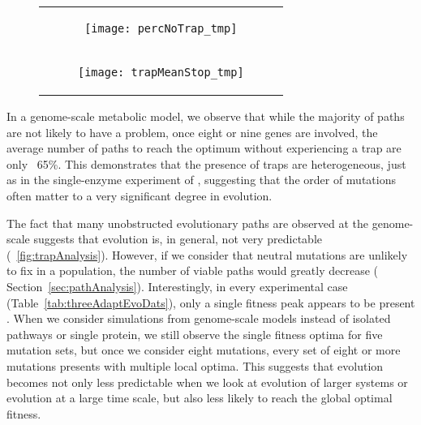 \label{fig:trapAnalysis}

\begin{figure}[H]
\newlength{\figwidth}
\setlength{\figwidth}{0.9\textwidth}
\centering
\begin{tabular}{c}
\begin{subfigure}[b]{\figwidth}
  \texttt{[image: percNoTrap\_tmp]}
  \caption{}
  \label{fig:trapAnalysis:percPath}
\end{subfigure}
\\
\begin{subfigure}[b]{\figwidth}
  \texttt{[image: trapMeanStop\_tmp]}
  \caption{} 
  \label{fig:trapAnalysis:meanStop}
\end{subfigure}
\\
\end{tabular}
\end{figure}


In a genome-scale metabolic model, we observe that while the majority
of paths are not likely to have a problem, once eight or nine genes are
involved, the average number of paths to reach the optimum without
experiencing a trap are only ~65\%. This demonstrates that the
presence of traps are heterogeneous, just as in the single-enzyme
experiment of \citet{Weinreich2006}, suggesting that the order of
mutations often matter to a very significant degree in evolution.

The fact that many unobstructed evolutionary paths are observed at the
genome-scale suggests that evolution is, in general, not very
predictable (\Fig~\ref{fig:trapAnalysis}). However, if we consider
that neutral mutations are unlikely to fix in a population, the number
of viable paths would greatly decrease (\suppOrApp
Section~\ref{sec:pathAnalysis}). Interestingly, in every experimental
case (Table~\ref{tab:threeAdaptEvoDats}), only a single fitness peak
appears to be present \citep{Lunzer2005,Weinreich2006}. When we
consider simulations from
genome-scale models instead of isolated pathways or single protein, we
still observe the single fitness optima for five mutation sets, but
once we consider eight mutations, every set of eight or more mutations
presents with multiple local optima. This suggests that evolution
becomes not only less predictable when we look at evolution of larger
systems or evolution at a large time scale, but also less likely to
reach the global optimal fitness.


